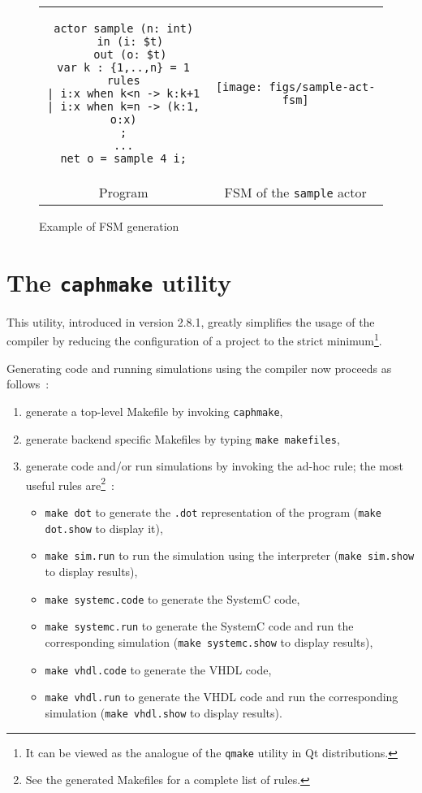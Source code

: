\begin{figure}[h]
\begin{tabular}[c]{cc}
  \begin{minipage}[b]{0.4\linewidth}
    \begin{lstlisting}
actor sample (n: int)
  in (i: $t)
  out (o: $t)
var k : {1,..,n} = 1
rules
| i:x when k<n -> k:k+1
| i:x when k=n -> (k:1, o:x)
;
...
net o = sample 4 i;
    \end{lstlisting} 
  \end{minipage} &
  \begin{minipage}[b]{0.6\linewidth}
  \texttt{[image: figs/sample-act-fsm]}
  \end{minipage} \\
Program & FSM of the \texttt{sample} actor
\end{tabular}
  \caption{Example of FSM generation}
  \label{fig:sample-act-fsm}
\end{figure}

\section{The \texttt{caphmake} utility}
\label{sec:makefiles}

This utility, introduced in version 2.8.1, greatly simplifies the usage of the compiler by reducing
the configuration of a \caph project to the strict minimum\footnote{It can be viewed as the analogue
  of the \texttt{qmake} utility in \textsf{Qt} distributions.}.

Generating code and running simulations using the \caph compiler now proceeds as follows~:
\begin{enumerate}
\item generate a top-level Makefile by invoking \verb|caphmake|,
\item generate backend specific Makefiles by typing \verb|make makefiles|,
\item generate code and/or run simulations by invoking the ad-hoc rule; the most useful rules
  are\footnote{See the generated Makefiles for a complete list of rules.}~:
  \begin{itemize}
  \item \verb|make dot| to generate the \verb|.dot| representation of the program (\verb|make dot.show| to display it),
  \item \verb|make sim.run| to run the simulation using the interpreter (\verb|make sim.show| to display results),
  \item \verb|make systemc.code| to generate the SystemC code,
  \item \verb|make systemc.run| to generate the SystemC code and run the corresponding simulation (\verb|make systemc.show| to display results),
  \item \verb|make vhdl.code| to generate the VHDL code,
  \item \verb|make vhdl.run| to generate the VHDL code and run the corresponding simulation
    (\verb|make vhdl.show| to display results).
  \end{itemize}
\end{enumerate}

